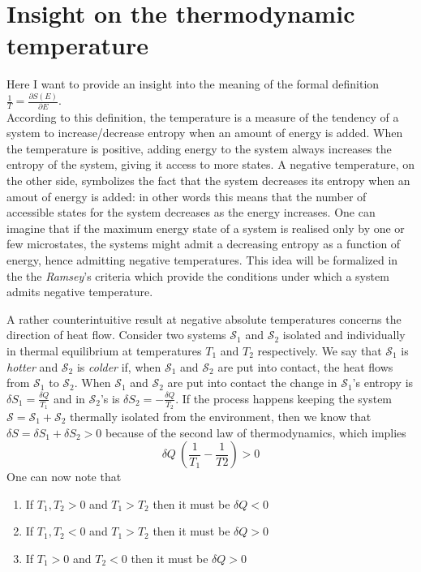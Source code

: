 \section{Insight on the thermodynamic temperature}
Here I want to provide an insight into the meaning of the formal definition $\frac{1}{T} = \frac{\partial S(E)}{\partial E}$. \\
According to this definition, the temperature is a measure of the tendency of a system to increase/decrease entropy when an amount of energy is added. When the temperature is positive, adding energy to the system always 
increases the entropy of the system, giving it access to more states. A negative temperature, on the other side, symbolizes the fact that the system decreases its entropy when an amout of energy is added: in other 
words this means that the number of accessible states for the system decreases as the energy increases. One can imagine that if the maximum energy state of a system is realised only by one or few microstates, the systems might admit a decreasing 
entropy as a function of energy, hence admitting negative temperatures. This idea will be formalized in the the \emph{Ramsey}'s criteria which provide the conditions under which a system admits negative temperature. \par
\vspace{15pt}
A rather counterintuitive result at negative absolute temperatures concerns the direction of heat flow. Consider two systems $\mathcal{S}_1$ and $\mathcal{S}_2$ isolated and individually in thermal equilibrium at temperatures $T_1$ and $T_2$ respectively. We say that $\mathcal{S}_1$ is \textit{hotter} and $\mathcal{S}_2$ is \textit{colder} if, when 
$\mathcal{S}_1$ and $\mathcal{S}_2$ are put into contact, the heat flows from $\mathcal{S}_1$ to $\mathcal{S}_2$. When $\mathcal{S}_1$ and $\mathcal{S}_2$ are put into contact the change in $\mathcal{S}_1$'s entropy is $\delta S_1 = \frac{\delta Q}{T_1}$ and in $\mathcal{S}_2$'s is $\delta S_2 = -\frac{\delta Q}{T_2}$. If the process happens keeping 
the system $\mathcal{S} = \mathcal{S}_1 + \mathcal{S}_2$ thermally isolated from the environment, then we know that $\delta S = \delta S_1 + \delta S_2 > 0$ because of the second law of thermodynamics, which implies 
\begin{equation*}
    \delta Q \ \left(\frac{1}{T_1} - \frac{1}{T2}\right) > 0
\end{equation*}
One can now note that
\begin{enumerate}
    \item If $T_1, T_2 > 0$ and $T_1 > T_2$ then it must be $\delta Q < 0$
    \item If $T_1, T_2 < 0$ and $T_1 > T_2$ then it must be $\delta Q > 0$
    \item If $T_1 > 0$ and $T_2 < 0$ then it must be $\delta Q > 0$
\end{enumerate}
